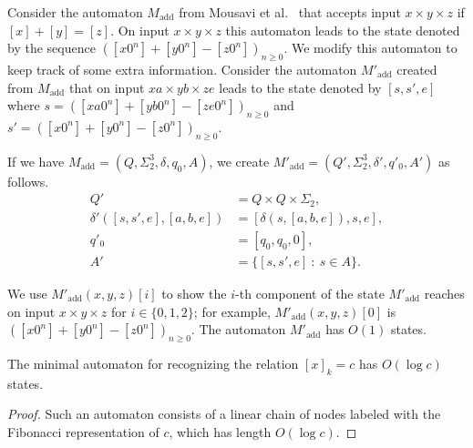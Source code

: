 \documentclass[12pt,reqno]{article}
\def\suchthat{\ : \ }
\DeclareMathOperator{\add}{add}
\begin{document}
Consider the automaton $M_{\add}$ from Mousavi et al.~\cite{mousavi_decision_2016} that accepts input $x \times y \times z$ if $[x]+[y]=[z]$. 
On input $x \times y \times z$ this automaton leads to the state denoted by the sequence $([x0^n] + [y0^n]-[z0^n])_{n \geq 0}$. We modify this automaton to keep track of some extra information. Consider the automaton $M'_{\add}$ created from $M_{\add}$ that on input $xa \times yb \times ze$ leads to the state denoted by $[s, s', e]$ where $s=([xa0^n] + [yb0^n]-[ze0^n])_{n \geq 0}$ and $s' = ([x0^n] + [y0^n]-[z0^n])_{n \geq 0}$. 

If we have $M_{\add} = (Q, \Sigma^3_2, \delta, q_0, A)$, we create $M'_{\add}=(Q', \Sigma^3_2, \delta', q'_0, A')$ as follows.
\begin{align*}
    Q' &= Q \times Q \times \Sigma_2, \\
    \delta'([s, s', e], [a, b, e]) &= [\delta(s, [a, b, e]), s , e], \\
    q'_0 &= [q_0, q_0, 0], \\
    A' &= \{[s, s', e] \suchthat s \in A\}.
\end{align*}

We use $M'_{\add}(x, y, z)[i]$ to show the $i$-th component of the state $M'_{\add}$ reaches on input $x \times y \times z$ for $i \in \{0, 1, 2\}$; for example, $M'_{\add}(x, y, z)[0]$ is $([x0^n] + [y0^n]-[z0^n])_{n \geq 0}$. 
The automaton $M'_{\add}$ has $O(1)$ states.


\begin{lemma} \label{lemma:=c-sc}
The minimal automaton for recognizing the relation
$[x]_k = c$ has $O(\log c)$ states. 
\end{lemma}

\begin{proof}
Such an automaton consists of a linear chain of nodes labeled with the Fibonacci representation of $c$, which has
length $O(\log c)$.  
\end{proof}
\end{document}
